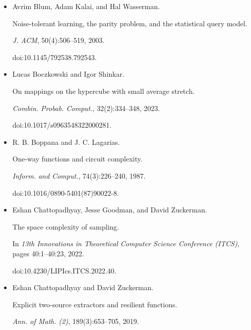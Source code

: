 \begin{itemize}
doi:10.1007/s11856-016-1302-0.





\item[] 
[6]

Avrim Blum, Adam Kalai, and Hal Wasserman.


Noise-tolerant learning, the parity problem, and the statistical
query model.


\emph{J. ACM}, 50(4):506–519, 2003.


doi:10.1145/792538.792543.





\item[] 
[7]

Lucas Boczkowski and Igor Shinkar.


On mappings on the hypercube with small average stretch.


\emph{Combin. Probab. Comput.}, 32(2):334–348, 2023.


doi:10.1017/s0963548322000281.





\item[] 
[8]

R. B. Boppana and J. C. Lagarias.


One-way functions and circuit complexity.


\emph{Inform. and Comput.}, 74(3):226–240, 1987.


doi:10.1016/0890-5401(87)90022-8.





\item[] 
[9]

Eshan Chattopadhyay, Jesse Goodman, and David Zuckerman.


The space complexity of sampling.


In \emph{13th Innovations in Theoretical Computer Science Conference
(ITCS)}, pages 40:1–40:23, 2022.


doi:10.4230/LIPIcs.ITCS.2022.40.





\item[] 
[10]

Eshan Chattopadhyay and David Zuckerman.


Explicit two-source extractors and resilient functions.


\emph{Ann. of Math. (2)}, 189(3):653–705, 2019.



\end{itemize}
